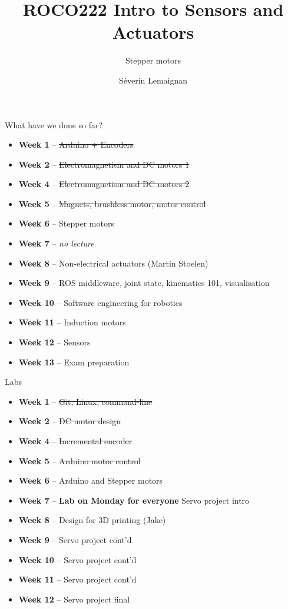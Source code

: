 \documentclass[compress]{beamer}
\title{ROCO222 \newline Intro to Sensors and Actuators}
\subtitle{Stepper motors}
\date{}
\author{Séverin Lemaignan}
\institute{Centre for Neural Systems and Robotics\\{\bf Plymouth University}}
\makeatletter
\def\beamer@writeslidentry@miniframesoff{%
  \expandafter\beamer@ifempty\expandafter{\beamer@framestartpage}{}%
  {%
    \clearpage\beamer@notesactions%
  }
}
\newcommand*{\miniframesoff}{\let\beamer@writeslidentry=\beamer@writeslidentry@miniframesoff}
\makeatother
\begin{document}

\maketitle

\miniframesoff
\begin{frame}{What have we done so far?}

\begin{itemize}
    \item \textbf{Week 1} -- \sout{Arduino + Encoders}
    \item \textbf{Week 2} -- \sout{Electromagnetism and DC motors 1}
    \item \textbf{Week 4} -- \sout{Electromagnetism and DC motors 2}
    \item \textbf{Week 5} -- \sout{Magnets, brushless motor, motor control}
    \item \textbf{Week 6} -- Stepper motors
    \item \textbf{Week 7} -- \emph{no lecture}
    \item \textbf{Week 8} -- Non-electrical actuators (Martin Stoelen)
    \item \textbf{Week 9} -- ROS middleware, joint state, kinematics 101, visualisation
    \item \textbf{Week 10} -- Software engineering for robotics
    \item \textbf{Week 11} -- Induction motors
    \item \textbf{Week 12} -- Sensors
    \item \textbf{Week 13} -- Exam preparation
\end{itemize}

\end{frame}

\begin{frame}{Labs}

\begin{itemize}
    \item \textbf{Week 1} -- \sout{Git, Linux, command-line}
    \item \textbf{Week 2} -- \sout{DC motor design}
    \item \textbf{Week 4} -- \sout{Incremental encoder}
    \item \textbf{Week 5} -- \sout{Arduino motor control}
    \item \textbf{Week 6} -- Arduino and Stepper motors
    \item \textbf{Week 7} -- \textbf{Lab on Monday for everyone} Servo project intro
    \item \textbf{Week 8} -- Design for 3D printing (Jake)
    \item \textbf{Week 9} -- Servo project cont'd
    \item \textbf{Week 10} -- Servo project cont'd
    \item \textbf{Week 11} -- Servo project cont'd
    \item \textbf{Week 12} -- Servo project final
\end{itemize}

\end{frame}
\end{document}
